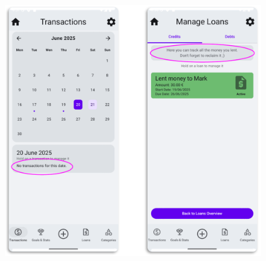 \documentclass[a4paper,12pt]{article}
\begin{document}
\begin{figure}[H]
    \centering
    \includegraphics[scale=0.6]{HEres2.png}
\end{figure}
\end{document}
